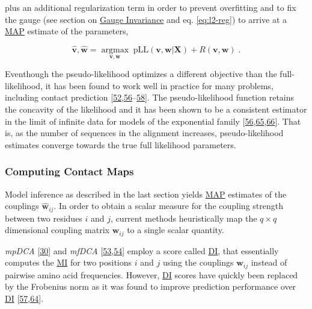 \documentclass[12pt,a4paper,twoside]{book}
\renewcommand{\v}{\mathbf{v}}
\newcommand{\w}{\mathbf{w}}
\newcommand{\wij}{\mathbf{w}_{ij}}
\theoremstyle{definition}
\theoremstyle{definition}
\theoremstyle{remark}
\begin{document}
plus an additional regularization term in order to prevent overfitting
and to fix the gauge (see section on
\protect\hyperlink{gauge-invariance}{Gauge Invariance} and eq.
\eqref{eq:l2-reg}) to arrive at a \protect\hyperlink{abbrev}{MAP} estimate
of the parameters,

\begin{equation}
    \hat{\v}, \hat{\w} = \underset{\v, \w}{\operatorname{argmax}} \; \text{pLL}(\v, \w | \mathbf{X}) + R(\v, \w) \; .
\end{equation}

Eventhough the pseudo-likelihood optimizes a different objective than
the full-likelihood, it has been found to work well in practice for many
problems, including contact prediction
{[}\protect\hyperlink{ref-Murphy2012}{52},\protect\hyperlink{ref-Koller2009}{56}--\protect\hyperlink{ref-Stein2015a}{58}{]}.
The pseudo-likelihood function retains the concavity of the likelihood
and it has been shown to be a consistent estimator in the limit of
infinite data for models of the exponential family
{[}\protect\hyperlink{ref-Koller2009}{56},\protect\hyperlink{ref-Besag1975}{65},\protect\hyperlink{ref-Gidas1988}{66}{]}.
That is, as the number of sequences in the alignment increases,
pseudo-likelihood estimates converge towards the true full likelihood
parameters.

\subsubsection{Computing Contact Maps}\label{post-processing-heuristics}

Model inference as described in the last section yields
\protect\hyperlink{abbrev}{MAP} estimates of the couplings
\(\hat{\w}_{ij}\). In order to obtain a scalar measure for the coupling
strength between two residues \(i\) and \(j\), current methods
heuristically map the \(q \! \times \! q\) dimensional coupling matrix
\(\wij\) to a single scalar quantity.

\emph{mpDCA} {[}\protect\hyperlink{ref-Weigt2009}{30}{]} and
\emph{mfDCA}
{[}\protect\hyperlink{ref-Morcos2011}{53},\protect\hyperlink{ref-Marks2011}{54}{]}
employ a score called \protect\hyperlink{abbrev}{DI}, that essentially
computes the \protect\hyperlink{abbrev}{MI} for two positions \(i\) and
\(j\) using the couplings \(\wij\) instead of pairwise amino acid
frequencies. However, \protect\hyperlink{abbrev}{DI} scores have quickly
been replaced by the Frobenius norm as it was found to improve
prediction performance over \protect\hyperlink{abbrev}{DI}
{[}\protect\hyperlink{ref-Ekeberg2013}{57},\protect\hyperlink{ref-Baldassi2014}{64}{]}.
\end{document}
